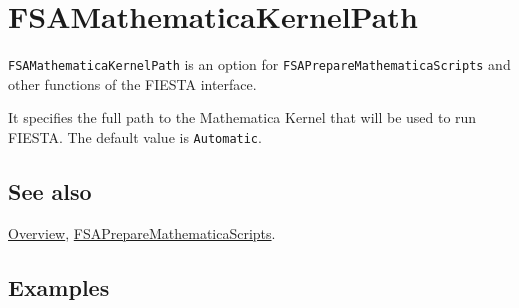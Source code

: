 \documentclass[../FeynHelpersManual.tex]{subfiles}
\begin{document}
\hypertarget{fsamathematicakernelpath}{
\section{FSAMathematicaKernelPath}\label{fsamathematicakernelpath}}

\texttt{FSAMathematicaKernelPath} is an option for
\texttt{FSAPrepareMathematicaScripts} and other functions of the FIESTA
interface.

It specifies the full path to the Mathematica Kernel that will be used
to run FIESTA. The default value is \texttt{Automatic}.

\subsection{See also}

\hyperlink{toc}{Overview},
\hyperlink{fsapreparemathematicascripts}{FSAPrepareMathematicaScripts}.

\subsection{Examples}
\end{document}

